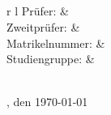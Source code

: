 
\thispagestyle{plain}
\begin{titlepage}
	\sffamily
	 \hspace*{10ex} \vcenteredvbox{\hbox{\strut \LARGE{\textbf{\art}}}\hbox{\strut \large{\autor}}}
	\\[32ex]

	{\fontsize{50}{60}\selectfont \textbf{\titel}}\\[1.5ex]
	\LARGE{\textbf{\untertitel}}\\[25ex]

	\normalsize
	\begin{center}
		\textsc{\fakultaet}\\[1ex]
		\begin{tabular}{r l}
			Prüfer:  & \quad \aufgabensteller\\[1.2ex]
			Zweitprüfer: & \quad \zweitpruefer\\[3ex]
			Matrikelnummer: & \quad \matrikelnr\\[1.2ex]
			Studiengruppe: & \quad \studiengruppe\\[3ex]
			\\[5ex]
		\end{tabular}
	\end{center}
	\ort, den \today
\end{titlepage}